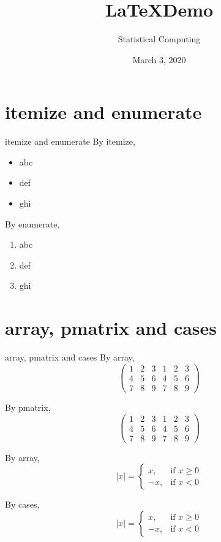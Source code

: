 \documentclass[12pt]{beamer}
\title{\LaTeX Demo}
\author{Statistical Computing}
\date{March 3, 2020}
\begin{document}
\begin{frame}
\titlepage
\end{frame}

\begin{frame}
\tableofcontents
\end{frame}

\section{itemize and enumerate}
\begin{frame}{itemize and enumerate}
	By itemize,
	\begin{itemize}
		\item abc
		\item def
		\item ghi
	\end{itemize}

	By enumerate,
	\begin{enumerate}[1]
		\item abc
		\item def
		\item ghi
	\end{enumerate}
\end{frame}

\section{array, pmatrix and cases}
\begin{frame}{array, pmatrix and cases}
	By array,
	$$ \left( \begin{array}{cccccc}
	1 & 2 & 3 & 1 & 2 & 3 \\
	4 & 5 & 6 & 4 & 5 & 6 \\
	7 & 8 & 9 & 7 & 8 & 9
	\end{array} \right) $$

	By pmatrix,
	$$ \begin{pmatrix}
	1 & 2 & 3 & 1 & 2 & 3 \\
	4 & 5 & 6 & 4 & 5 & 6 \\
	7 & 8 & 9 & 7 & 8 & 9
	\end{pmatrix}$$

	By array,
	$$|x| = \left\{ \begin{array}{rr}
	x,  & \mbox{if $x \geq 0$} \\
	-x, & \mbox{if $x < 0$}
	\end{array} \right.$$

	By cases,
	$$ |x|=
	\begin{cases}
	x,  & \mbox{if $x \geq 0$} \\
	-x, & \mbox{if $x < 0$}
	\end{cases}$$
\end{frame}
\end{document}
